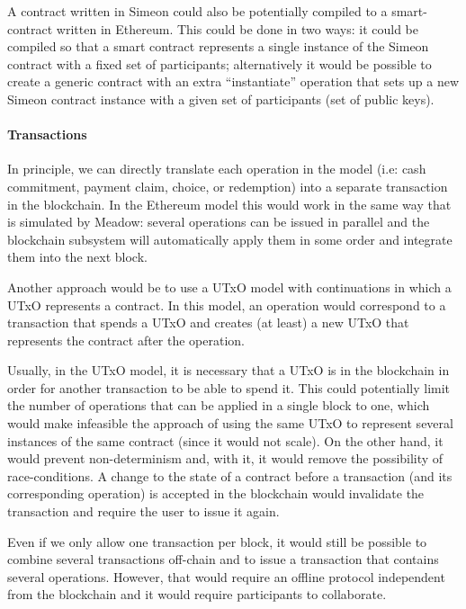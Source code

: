\documentclass[runningheads]{llncs}
\begin{document}
A contract written in Simeon could also be potentially
compiled to a smart-contract written in Ethereum. This could be done in two ways: it could be compiled so that a 
smart contract represents a single instance of the Simeon contract with a fixed set of participants; 
alternatively it would be possible to create a generic contract with an extra ``instantiate'' operation that 
sets up a new Simeon contract instance with a given set of participants (set of public keys).

\paragraph{Transactions}

In principle, we can directly translate each operation in the model (i.e: cash commitment, payment claim, choice, or
redemption) into a separate transaction in the blockchain. In the Ethereum model this would work in the same 
way that is simulated by Meadow: several operations can be issued in parallel and the blockchain subsystem will 
automatically apply them in some order and integrate them into the next block.

Another approach would be to use a UTxO model with continuations in which a UTxO represents a contract. In this model,
an operation would correspond to a transaction that spends a UTxO and creates (at least) a new UTxO that represents the 
contract after the operation.

Usually, in the UTxO model, it is necessary that a UTxO is in the blockchain in order for another transaction to be 
able to spend it. This could potentially limit the number of operations that can be applied in a single block to one, 
which would make infeasible the approach of using the same UTxO to represent several instances of the same contract 
(since it would not scale).
On the other hand, it would prevent non-determinism and, with it, it would remove the possibility of race-conditions. A 
change to the state of a contract before a transaction (and its corresponding operation) is accepted in the blockchain 
would invalidate the transaction and require the user to issue it again.

Even if we only allow one transaction per block, it would still be possible to combine several transactions off-chain 
and to issue a transaction that contains several operations. However, that would require an offline protocol 
independent from the blockchain and it would require participants to collaborate.
\end{document}
